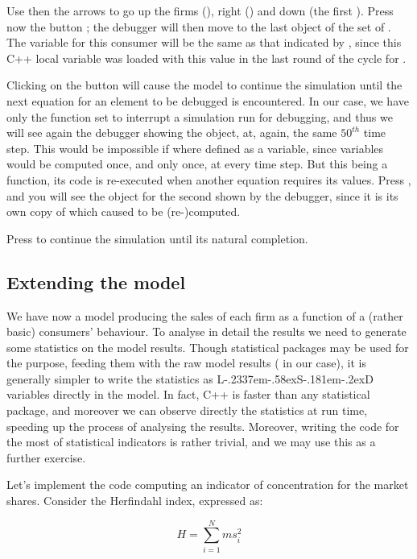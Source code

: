 \documentclass [11pt,a4paper] {book}
\def\LsD{{L\kern-.2337em\lower-.58ex\hbox{S}\kern-.181em\lower-.2ex\hbox{D}}\xspace}
\begin{document}
Use then the arrows to go up the firms (), right () and down (the first ). Press now the button ; the debugger will then move to the last object of the set of . The variable  for this consumer will be the same as that indicated by , since this C++ local variable was loaded with this value in the last round of the cycle for .

Clicking on the button  will cause the model to continue the simulation until the next equation for an element to be debugged is encountered. In our case, we have only the function  set to interrupt a simulation run for debugging, and thus we will see again the debugger showing the  object, at, again, the same $50^{th}$ time step. This would be impossible if  where defined as a variable, since variables would be computed once, and only once, at every time step. But this being a function, its code is re-executed when another equation requires its values. Press , and you will see the object for the second  shown by the debugger, since it is its own copy of  which caused  to be (re-)computed.

Press  to continue the simulation until its natural completion.

\subsection{Extending the model}

We have now a model producing the sales of each firm as a function of a (rather basic) consumers' behaviour. To analyse in detail the results we need to generate some statistics on the model results. Though statistical packages may be used for the purpose, feeding them with the raw model results ( in our case), it is generally simpler to write the statistics as \LsD variables directly in the model. In fact, C++ is faster than any statistical package, and moreover we can observe directly the statistics at run time, speeding up the process of analysing the results. Moreover, writing the code for the most of statistical indicators is rather trivial, and we may use this as a further exercise.

Let's implement the code computing an indicator of concentration for the market shares. Consider the Herfindahl index, expressed as:

\[
H=\displaystyle \sum_{i=1}^N ms_i^2
\]
\end{document}
